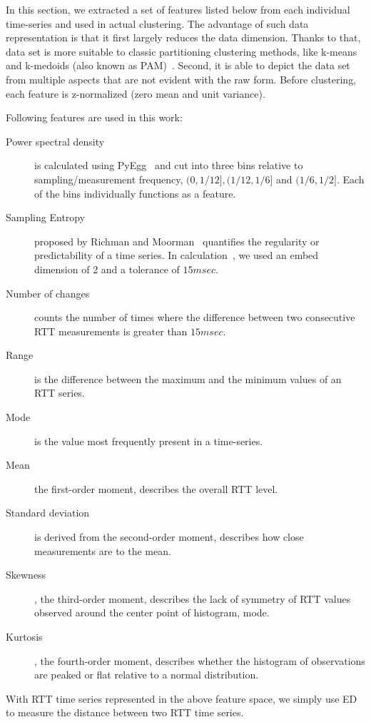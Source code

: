 In this section, we extracted a set of features listed below from each individual time-series and used in actual clustering. 
The advantage of such data representation is that it first largely reduces the data dimension. Thanks to that, data set is more suitable to classic partitioning clustering methods, like k-means and k-medoids (also known as \acf{PAM})~\cite{Lin2003}.
Second, it is able to depict the data set from multiple aspects that are not evident with the raw form. 
Before clustering, each feature is z-normalized (zero mean and unit variance).

Following features are used in this work:
\begin{description}
\item[Power spectral density] is calculated using PyEgg~\cite{Bao2011} and cut into three bins relative to sampling/measurement frequency, $(0, 1/12], (1/12, 1/6]$ and $(1/6, 1/2]$. Each of the bins individually functions as a feature.
\item[Sampling Entropy] proposed by Richman and Moorman~\cite{Richman2000} quantifies the regularity or predictability of a time series. In calculation~\cite{Bao2011}, we used an embed dimension of 2 and a tolerance of $15msec$.
\item[Number of changes] counts the number of times where the difference between two consecutive RTT measurements is greater than $15msec$. %
\item[Range] is the difference between the maximum and the minimum values of an RTT series.
\item[Mode] is the value most frequently present in a time-series.
\item[Mean] the first-order moment, describes the overall RTT level.
\item[Standard deviation] is derived from the second-order moment, describes how close measurements are to the mean.
\item[Skewness], the third-order moment, describes the lack of symmetry of RTT values observed around the center point of histogram, mode.
\item[Kurtosis], the fourth-order moment, describes whether the histogram of observations are peaked or flat relative to a normal distribution.
\end{description}
With RTT time series represented in the above feature space, we simply use \acf{ED} to measure the distance between two RTT time series.

